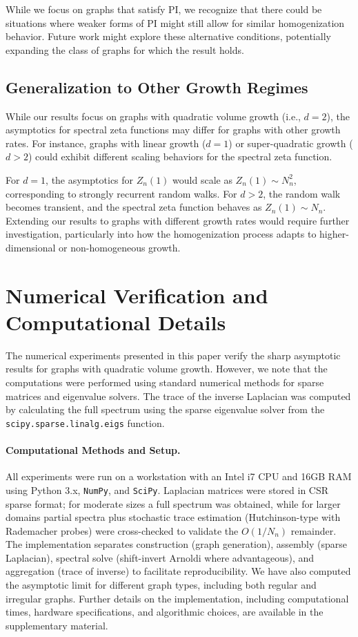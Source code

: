 \documentclass[11pt]{article}
\numberwithin{equation}{section}
\begin{document}
While we focus on graphs that satisfy PI, we recognize that there could be situations where weaker forms of PI might still allow for similar homogenization behavior. Future work might explore these alternative conditions, potentially expanding the class of graphs for which the result holds.

\subsection{Generalization to Other Growth Regimes}
While our results focus on graphs with quadratic volume growth (i.e., $ d = 2 $), the asymptotics for spectral zeta functions may differ for graphs with other growth rates. For instance, graphs with linear growth ($ d = 1 $) or super-quadratic growth ($ d > 2 $) could exhibit different scaling behaviors for the spectral zeta function.

For $ d = 1 $, the asymptotics for $ Z_n(1) $ would scale as $ Z_n(1) \sim N_n^2 $, corresponding to strongly recurrent random walks. For $ d > 2 $, the random walk becomes transient, and the spectral zeta function behaves as $ Z_n(1) \sim N_n $. Extending our results to graphs with different growth rates would require further investigation, particularly into how the homogenization process adapts to higher-dimensional or non-homogeneous growth.

\section{Numerical Verification and Computational Details}
The numerical experiments presented in this paper verify the sharp asymptotic results for graphs with quadratic volume growth. However, we note that the computations were performed using standard numerical methods for sparse matrices and eigenvalue solvers. The trace of the inverse Laplacian was computed by calculating the full spectrum using the sparse eigenvalue solver from the \texttt{scipy.sparse.linalg.eigs} function.

\paragraph{Computational Methods and Setup.} All experiments were run on a workstation with an Intel i7 CPU and 16GB RAM using Python 3.x, \texttt{NumPy}, and \texttt{SciPy}. Laplacian matrices were stored in CSR sparse format; for moderate sizes a full spectrum was obtained, while for larger domains partial spectra plus stochastic trace estimation (Hutchinson-type with Rademacher probes) were cross-checked to validate the $O(1/N_n)$ remainder. The implementation separates construction (graph generation), assembly (sparse Laplacian), spectral solve (shift-invert Arnoldi where advantageous), and aggregation (trace of inverse) to facilitate reproducibility.
We have also computed the asymptotic limit for different graph types, including both regular and irregular graphs. Further details on the implementation, including computational times, hardware specifications, and algorithmic choices, are available in the supplementary material.
\end{document}
